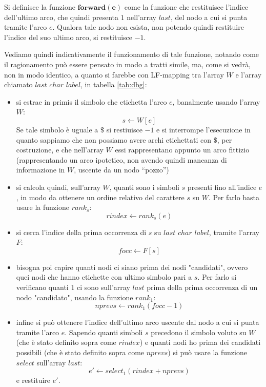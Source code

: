 \documentclass[a4paper,12pt, oneside]{book}
\begin{document}
\begin{definizione}
  Si definisce la funzione $\mathbf{forward(e)}$ come la funzione che
  restituisce l'indice dell'ultimo arco, che quindi presenta $1$ nell'array
  $last$, del nodo a cui si punta tramite l'arco $e$. Qualora tale nodo non
  esista, non potendo quindi restituire l'indice del suo ultimo arco, si
  restituisce $-1$.  
\end{definizione}
\noindent
Vediamo quindi indicativamente il funzionamento di tale funzione, notando come
il ragionamento può essere pensato in modo a tratti simile, ma, come si vedrà,
non in modo identico, a quanto si farebbe con 
LF-mapping tra l'array $W$ e l'array chiamato $last$ $char$ $label$, in tabella
\ref{tab:dbg}: 
\begin{itemize}
  \item si estrae in primis il simbolo che etichetta l'arco $e$, banalmente
  usando l'array $W$:
  \[s \gets W[e]\]
  Se tale simbolo è uguale a $\$$ si restiuisce $-1$ e si interrompe
  l'esecuzione in quanto sappiamo che non possiamo avere archi etichettati con
  $\$$, per costruzione, e che nell'array $W$ essi rappresentano appunto un arco
  fittizio (rappresentando un arco ipotetico, non avendo quindi mancanza di
  informazione in $W$, uscente da un nodo ``pozzo'')
  \item si calcola quindi, sull'array $W$, quanti sono i simboli $s$ presenti
  fino all'indice $e$, in modo da ottenere un ordine relativo del carattere $s$ su
  $W$. Per farlo basta usare la funzione $rank_s$: 
  \[rindex \gets rank_s(e)\]
  \item si cerca l'indice della prima occorrenza di $s$ su $last$ $char$
  $label$, tramite l'array $F$:
  \[focc \gets F[s]\]
  \item bisogna poi capire quanti nodi ci siano prima dei nodi "candidati",
  ovvero quei nodi che hanno etichette con ultimo simbolo pari a $s$. Per farlo
  si verificano quanti $1$ ci sono sull'array $last$ prima della prima
  occorrenza di un nodo "candidato", usando la funzione $rank_1$:
  \[nprevs \gets rank_1(focc-1)\]
  \item infine si può ottenere l'indice dell'ultimo arco uscente dal nodo a cui
  si punta tramite l'arco $e$. Sapendo quanti simboli $s$ precedono il simbolo
  voluto su $W$ (che è stato definito sopra come $rindex$) e quanti nodi ho
  prima dei candidati possibili (che è stato definito sopra come $nprevs$) si
  può usare la funzione $select$ sull'array $last$:  
  \[e' \gets select_1(rindex + nprevs)\]
  e restituire $e'$.
\end{itemize}
\end{document}
